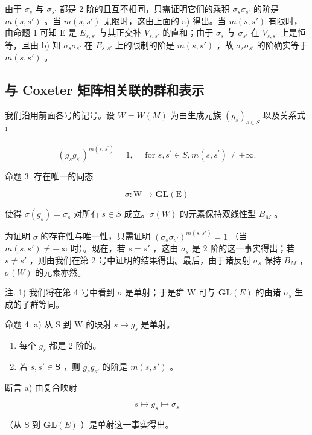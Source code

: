由于 \(\sigma_s\) 与 \(\sigma_{s'}\) 都是 2 阶的且互不相同，只需证明它们的乘积 \(\sigma_s\sigma_{s'}\) 的阶是 \(m(s,s')\) 。当 \(m(s,s')\) 无限时，这由上面的 a) 得出。当 \(m(s, s')\) 有限时，由命题 1 可知 E 是 \(E_{s,s'}\) 与其正交补 \(V_{s,s'}\) 的直和；由于 \(\sigma_s\) 与 \(\sigma_{s'}\) 在 \(V_{s,s'}\) 上是恒等，且由 b) 知 \(\sigma_s\sigma_{s'}\) 在 \(E_{s,s'}\) 上的限制的阶是 \(m(s, s')\) ，故 \(\sigma_s\sigma_{s'}\) 的阶确实等于 \(m(s, s')\) 。

\subsection{与 Coxeter 矩阵相关联的群和表示}

我们沿用前面各号的记号。设 \(W = W(M)\) 为由生成元族 \((g_{s})_{s \in S}\) 以及关系式 \(^{1}\)

\[
\left(g _ {s} g _ {s ^ {\prime}}\right) ^ {m \left(s, s ^ {\prime}\right)} = 1, \quad \text { for } s, s ^ {\prime} \in S, m \left(s, s ^ {\prime}\right) \neq + \infty .
\]

命题 3. 存在唯一的同态

\[
\sigma : \mathrm{W} \rightarrow \mathbf {G L} (\mathrm{E})
\]

使得 \(\sigma(g_s) = \sigma_s\) 对所有 \(s \in S\) 成立。\(\sigma(W)\) 的元素保持双线性型 \(B_M\) 。

为证明 \(\sigma\) 的存在性与唯一性，只需证明 \((\sigma_s \sigma_{s'})^{m(s, s')} = 1\) （当 \(m(s, s') \neq +\infty\) 时）。现在，若 \(s = s'\) ，这由 \(\sigma_s\) 是 2 阶的这一事实得出；若 \(s \neq s'\) ，则由我们在第 2 号中证明的结果得出。最后，由于诸反射 \(\sigma_s\) 保持 \(B_M\) ，\(\sigma(W)\) 的元素亦然。

注. 1) 我们将在第 4 号中看到 \(\sigma\) 是单射；于是群 W 可与 \(\mathbf{GL}(E)\) 的由诸 \(\sigma_s\) 生成的子群等同。

命题 4. a) 从 S 到 W 的映射 \(s \mapsto g_s\) 是单射。

\begin{enumerate}
\def\labelenumi{\alph{enumi})}
\setcounter{enumi}{1}
\item
  每个 \(g_{s}\) 都是 2 阶的。
\item
  若 \(s, s' \in \mathbf{S}\) ，则 \(g_s g_{s'}\) 的阶是 \(m(s, s')\) 。
\end{enumerate}

断言 a) 由复合映射

\[
s \mapsto g _ {s} \mapsto \sigma_ {s}
\]

（从 S 到 \(\mathbf{GL}(E)\) ）是单射这一事实得出。

